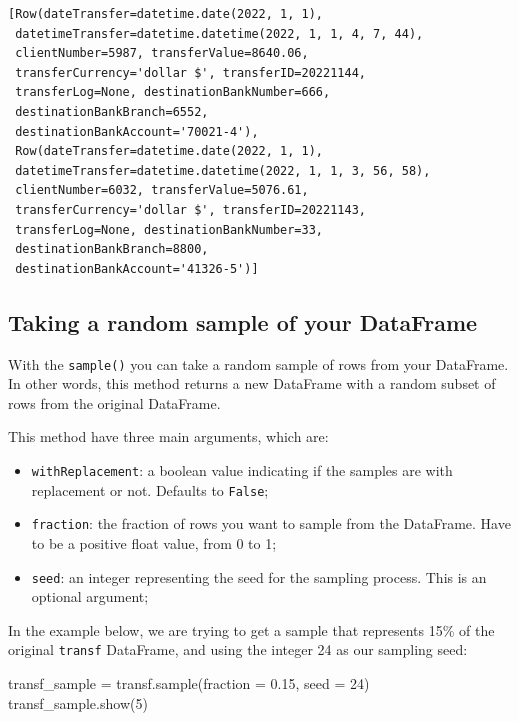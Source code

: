 \documentclass[
  11pt,
  letterpaper,
  DIV=11,
  numbers=noendperiod]{scrreprt}
\newenvironment{Shaded}{\begin{snugshade}}{\end{snugshade}}
\newcommand{\DecValTok}[1]{\textcolor[rgb]{0.68,0.00,0.00}{#1}}
\newcommand{\FloatTok}[1]{\textcolor[rgb]{0.68,0.00,0.00}{#1}}
\newcommand{\NormalTok}[1]{\textcolor[rgb]{0.00,0.23,0.31}{#1}}
\newcommand{\OperatorTok}[1]{\textcolor[rgb]{0.37,0.37,0.37}{#1}}
\providecommand{\tightlist}{%
  \setlength{\itemsep}{0pt}\setlength{\parskip}{0pt}}\usepackage{longtable,booktabs,array}
\begin{document}
\begin{verbatim}
[Row(dateTransfer=datetime.date(2022, 1, 1), 
 datetimeTransfer=datetime.datetime(2022, 1, 1, 4, 7, 44), 
 clientNumber=5987, transferValue=8640.06, 
 transferCurrency='dollar $', transferID=20221144, 
 transferLog=None, destinationBankNumber=666, 
 destinationBankBranch=6552, 
 destinationBankAccount='70021-4'), 
 Row(dateTransfer=datetime.date(2022, 1, 1), 
 datetimeTransfer=datetime.datetime(2022, 1, 1, 3, 56, 58), 
 clientNumber=6032, transferValue=5076.61, 
 transferCurrency='dollar $', transferID=20221143, 
 transferLog=None, destinationBankNumber=33, 
 destinationBankBranch=8800, 
 destinationBankAccount='41326-5')]
\end{verbatim}

\subsection{Taking a random sample of your
DataFrame}\label{taking-a-random-sample-of-your-dataframe}

With the \texttt{sample()} you can take a random sample of rows from
your DataFrame. In other words, this method returns a new DataFrame with
a random subset of rows from the original DataFrame.

This method have three main arguments, which are:

\begin{itemize}
\tightlist
\item
  \texttt{withReplacement}: a boolean value indicating if the samples
  are with replacement or not. Defaults to \texttt{False};
\item
  \texttt{fraction}: the fraction of rows you want to sample from the
  DataFrame. Have to be a positive float value, from 0 to 1;
\item
  \texttt{seed}: an integer representing the seed for the sampling
  process. This is an optional argument;
\end{itemize}

In the example below, we are trying to get a sample that represents 15\%
of the original \texttt{transf} DataFrame, and using the integer 24 as
our sampling seed:

\begin{Shaded}
\begin{Highlighting}[]
\NormalTok{transf\_sample }\OperatorTok{=}\NormalTok{ transf.sample(fraction }\OperatorTok{=} \FloatTok{0.15}\NormalTok{, seed }\OperatorTok{=} \DecValTok{24}\NormalTok{)}
\NormalTok{transf\_sample.show(}\DecValTok{5}\NormalTok{)}
\end{Highlighting}
\end{Shaded}
\end{document}
